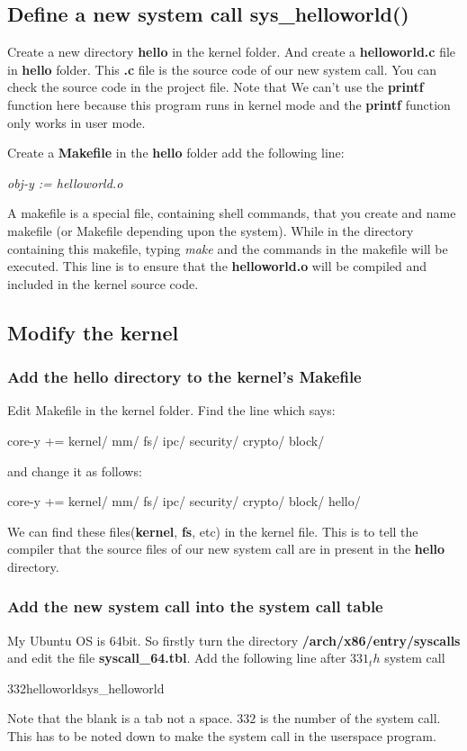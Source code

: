 \documentclass[12pt]{article}
\begin{document}
\subsection{Define a new system call sys\_helloworld()}
Create a new directory \textbf{hello} in the kernel folder. And create a \textbf{helloworld.c} file in \textbf{hello} folder. This \textbf{.c} file is the source code of our new system call. You can check the source code in the project file. Note that We can't use the \textbf{printf} function here because this program runs in kernel mode and the \textbf{printf} function only works in user mode.

Create a \textbf{Makefile} in the \textbf{hello} folder add the following line:
\begin{center}
	\emph{obj-y := helloworld.o}
\end{center}
 A makefile is a special file, containing shell commands, that you create and name makefile (or Makefile depending upon the system). While in the directory containing this makefile, typing \emph{make} and the commands in the makefile will be executed. This line is to ensure that the \textbf{helloworld.o} will be compiled and included in the kernel source code.

\subsection{Modify the kernel}
\subsubsection{Add the hello directory to the kernel's Makefile}
Edit Makefile in the kernel folder. Find the line which says:
\begin{center}
core-y += kernel/ mm/ fs/ ipc/ security/ crypto/ block/
\end{center}
and change it as follows:
\begin{center}
	core-y += kernel/ mm/ fs/ ipc/ security/ crypto/ block/ hello/
\end{center}
We can find these files(\textbf{kernel}, \textbf{fs}, etc) in the kernel file. This is to tell the compiler that the source files of our new system call are in present in the \textbf{hello} directory.

\subsubsection{Add the new system call into the system call table}
My Ubuntu OS is 64bit. So firstly turn the directory \textbf{/arch/x86/entry/syscalls} and edit the file \textbf{syscall\_64.tbl}. Add the following line after $331_th$ system call
\begin{center}
	332\space\space\space{}\space\space\space\space	helloworld\space\space\space\space\space\space\space\space		sys\_helloworld
\end{center}
Note that the blank is a tab not a space. $332$ is the number of the system call. This has to be noted down to make the system call in the userspace program.
\end{document}
